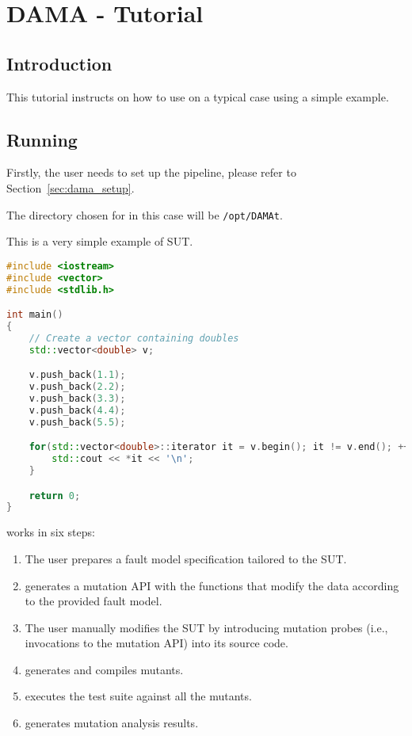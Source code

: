 
\chapter{DAMA - Tutorial}
\label{chapter:dama:tutorial}

\section{Introduction}

This tutorial instructs on how to use \DAMA on a typical case using a simple example.

\section{Running \DAMA}
\label{sec:dama_single_machine}

Firstly, the user needs to set up the \DAMA pipeline, please refer to Section~\ref{sec:dama_setup}.

The directory chosen for \DAMA in this case will be \texttt{/opt/DAMAt}.

This is a very simple example of SUT.

\begin{lstlisting}[language=c++]
#include <iostream>
#include <vector>
#include <stdlib.h>

int main()
{
    // Create a vector containing doubles
    std::vector<double> v;

    v.push_back(1.1);
    v.push_back(2.2);
    v.push_back(3.3);
    v.push_back(4.4);
    v.push_back(5.5);

    for(std::vector<double>::iterator it = v.begin(); it != v.end(); ++it) {
    	std::cout << *it << '\n';
    }

    return 0;
}
\end{lstlisting}

\DAMA works in six steps:

\begin{enumerate}
	\item The user prepares a fault model specification tailored to the SUT.
	\item \DAMA generates a mutation API with the functions that modify the data according to the provided fault model.
	\item The user manually modifies the SUT by introducing mutation probes (i.e., invocations to the mutation API) into its source code.
	\item \DAMA generates and compiles mutants.
	\item \DAMA executes the test suite against all the mutants.
	\item \DAMA generates mutation analysis results.
\end{enumerate}


